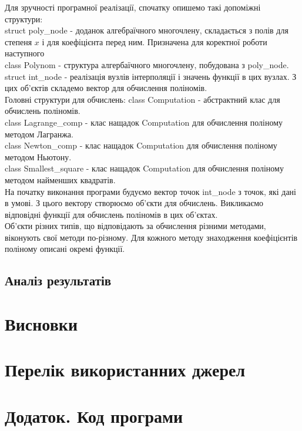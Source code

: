 \documentclass[14pt,a4paper,titlepage]{extarticle}
\begin{document}
Для зручності програмної реалізації, спочатку опишемо такі допоміжні структури:\\
 struct poly\_node - доданок алгебраїчного многочлену, складається з полів для степеня $x$ і для коефіцієнта перед ним. Призначена для коректної роботи наступного\\
 class Polynom - структура алгербаїчного многочлену, побудована з poly\_node.\\
 struct int\_node - реалізація вузлів інтерполяції і значень функції в цих вузлах. З цих об'єктів складемо вектор для обчислення поліномів.\\
 Головні структури для обчислень:
 class Computation - абстрактний клас для обчислень поліномів.\\
 class Lagrange\_comp - клас нащадок Computation для обчислення поліному методом Лагранжа.\\
 class Newton\_comp - клас нащадок Computation для обчислення поліному методом Ньютону.\\
 class Smallest\_square - клас нащадок Computation для обчислення поліному методом найменших квадратів.\\
 На початку виконання програми будуємо вектор точок int\_node з точок, які дані в умові. З цього вектору створюємо об'єкти для обчислень. Викликаємо відповідні функції для обчислень поліномів в цих об'єктах.\\
 Об'єкти різних типів, що відповідають за обчислення різними методами, віконують свої методи по-різному. 
 Для кожного методу знаходження коефіцієнтів поліному описані окремі функції.
{\centering \subsection{Аналіз результатів}}
{\centering \section*{Висновки}}

{\centering \section*{Перелік використанних джерел}}

\newpage
{\centering \section*{Додаток. Код програми}}
\end{document}
